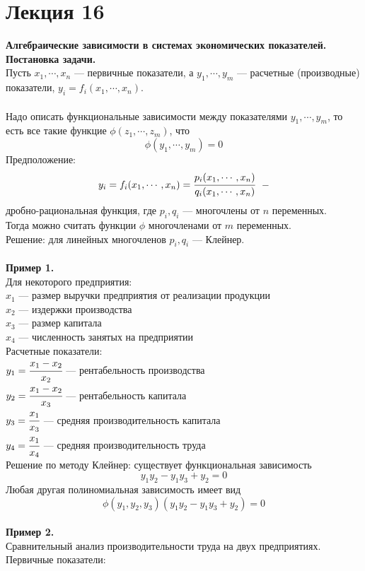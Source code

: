 \documentclass[12pt]{article}
\theoremstyle{definition}
\numberwithin{equation}{section}
\begin{document}
	\section *{Лекция 16}
	\noindent\textbf{Алгебраические зависимости в системах экономических показателей.}\\
	\textbf{Постановка задачи.}\\
	Пусть $x_1,\cdots,x_n$ --- первичные показатели, а $y_1, \cdots, y_m$ --- расчетные (производные) показатели, $y_i=f_i(x_1,\cdots,x_n)$.\\
	\\
	Надо описать функциональные зависимости между показателями $y_1,\cdots,y_m$, то есть все такие функцие $\phi(z_1,\cdots,z_m)$, что $$\phi(y_1,\cdots,y_m)=0$$
	Предположение:
	$$y_i=f_i(x_1,\cdots,x_n)=\cfrac{p_i(x_1,\cdots,x_n)}{q_i(x_1,\cdots,x_n)} ~~-$$
	дробно-рациональная функция, где $p_i, q_i$ --- многочлены от $n$ переменных.\\
	Тогда можно считать функции $\phi$ многочленами от $m$ переменных.\\
	Решение: для линейных многочленов $p_i, q_i$ --- Клейнер.\\
	\\
	\textbf{Пример 1.}\\
	Для некоторого предприятия:\\
	$x_1$ --- размер выручки предприятия от реализации продукции\\
	$x_2$ --- издержки производства\\
	$x_3$ --- размер капитала\\
	$x_4$ --- численность занятых на предприятии\\
	Расчетные показатели:\\
	$y_1=\cfrac{x_1-x_2}{x_2}$ --- рентабельность производства\\
	$y_2=\cfrac{x_1-x_2}{x_3}$ --- рентабельность капитала\\
	$y_3=\cfrac{x_1}{x_3}$ --- средняя производительность капитала\\
	$y_4=\cfrac{x_1}{x_4}$ --- средняя производительность труда\\
	Решение по методу Клейнер: существует функциональная зависимость $$y_1y_2-y_1y_3+y_2=0$$
	Любая другая полиномиальная зависимость имеет вид $$\phi(y_1, y_2, y_3)(y_1y_2-y_1y_3+y_2)=0$$
	\\
	\textbf{Пример 2.}\\
	Сравнительный анализ производительности труда на двух предприятиях.\\
	Первичные показатели:\\
\end{document}
